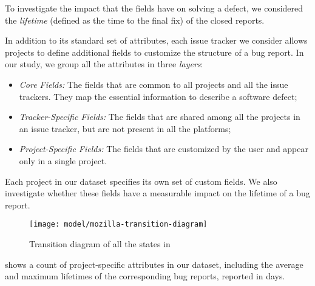 To investigate the impact that the fields have on solving a defect, we considered the \emph{lifetime} (defined as the time to the final fix) of the closed reports.

In addition to its standard set of attributes, each issue tracker we consider allows projects to define additional fields to customize the structure of a bug report.
In our study, we group all the attributes in three \emph{layers}:

\begin{itemize}[$\circ$]
\item \textit{Core Fields:} The fields that are common to all projects and all the issue trackers.
They map the essential information to describe a software defect;
\item \textit{Tracker-Specific Fields:} The fields that are shared among all the projects in an issue tracker, but are not present in all the platforms;
\item \textit{Project-Specific Fields:} The fields that are customized by the user and appear only in a single project.
\end{itemize}

Each project in our dataset specifies its own set of custom fields.
We also investigate whether these fields have a measurable impact on the lifetime of a bug report.

\begin{figure}[h!]
\centering
\texttt{[image: model/mozilla-transition-diagram]}
\caption{Transition diagram of all the states in \bzilla}
\label{fig:mozilla_transitions}
\end{figure}

  shows a count of project-specific attributes in our dataset, including the average and maximum lifetimes of the corresponding bug reports, reported in days.

